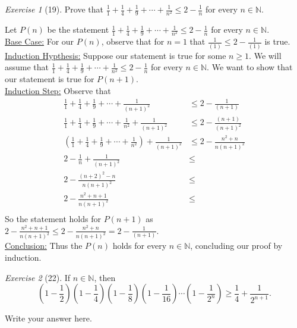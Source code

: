 \documentclass[12pt]{amsart}
\makeatletter
\theoremstyle{remark}
\newtheorem*{exercise}{Exercise}%
\def\NN{\ensuremath{\mathbb N}}
\renewenvironment{proof}[1][\proofname]{\par\doublespacing
  \pushQED{\qed}%
  \normalfont \topsep6\p@\@plus6\p@\relax
  \list{}{%
    \settowidth{\leftmargin}{\itshape\proofname:\hskip\labelsep}%
    \setlength{\labelwidth}{0pt}%
    \setlength{\itemindent}{-\leftmargin}%
  }%
  \item[\hskip\labelsep\itshape#1\@addpunct{:}]\ignorespaces
}{%
  \popQED\endlist\@endpefalse
  \singlespacing
}
\theoremstyle{mycomment}
\makeatother
\begin{document}
\begin{exercise}[19] Prove that $\displaystyle \frac{1}{1}+\frac{1}{4}+\frac{1}{9}+\cdots+\frac{1}{n^{2}}\le 2-\frac{1}{n}$ for every $n\in\NN$.
\begin{proof}
  Let $P(n)$ be the statement $\displaystyle \frac{1}{1}+\frac{1}{4}+\frac{1}{9}+\cdots+\frac{1}{n^{2}}\le 2-\frac{1}{n}$ for every $n\in\NN$.\\
  \underline{Base Case:} For our $P(n)$, observe that for $n=1$ that $\frac{1}{(1)} \leq 2 - \frac{1}{(1)}$ is true. \\
  \underline{Induction Hypthesis:} Suppose our statement is true for some $n \geq 1$. We will assume that  $\displaystyle \frac{1}{1}+\frac{1}{4}+\frac{1}{9}+\cdots+\frac{1}{n^{2}}\le 2-\frac{1}{n}$ for every $n\in\NN$. We want to show that our statement is true for $P(n+1)$. \\
  \underline{Induction Step:} Observe that
  \begin{align*}
    \displaystyle \frac{1}{1}+\frac{1}{4}+\frac{1}{9}+\cdots+\frac{1}{(n+1)^{2}} &\leq  2 - \frac{1}{(n+1)}\\
    \displaystyle \frac{1}{1}+\frac{1}{4}+\frac{1}{9}+\cdots+\frac{1}{n^{2}} + \frac{1}{(n+1)^2} &\leq 2 - \frac{(n+1)}{(n+1)^2}\\
    (\displaystyle \frac{1}{1}+\frac{1}{4}+\frac{1}{9}+\cdots+\frac{1}{n^{2}}) + \frac{1}{(n+1)^2} &\leq 2 - \frac{n^2 + n}{n(n+1)^2}\\
    2 - \frac{1}{n} + \frac{1}{(n+1)^2} &\leq \\
    2 - \frac{(n+2)^2 - n}{n(n+1)^2} &\leq \\
    2 - \frac{n^2 + n + 1}{n(n+1)^2} &\leq \\
  \end{align*}
  So the statement holds for $P(n+1)$ as $ 2 - \frac{n^2 + n + 1}{n(n+1)^2} \leq 2 - \frac{n^2 + n}{n(n+1)^2} = 2 - \frac{1}{(n+1)}$. \\
  \underline{Conclusion:} Thus the $P(n)$ holds for every $n \in \NN$, concluding our proof by induction.
\end{proof}
\end{exercise}

\begin{exercise}[22] If $n\in\NN$, then $$\left(1-\frac{1}{2}\right)\left(1-\frac{1}{4}\right)\left(1-\frac{1}{8}\right)\left(1-\frac{1}{16}\right)\cdots\left(1-\frac{1}{2^{n}}\right)\ge \frac{1}{4}+\frac{1}{2^{n+1}}.$$
\begin{proof}
Write your answer here.
\end{proof}
\end{exercise}
\end{document}
